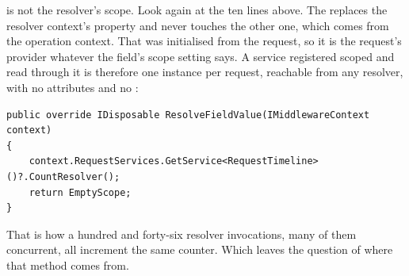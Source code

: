  is not the resolver's scope. Look again
at the ten lines above. The  replaces the resolver context's
 property and never touches the other one, which comes from the
operation context. That was initialised from the request, so it is the
request's provider whatever the field's scope setting says. A service
registered scoped and read through it is therefore one instance per request,
reachable from any resolver, with no attributes and no :

\begin{verbatim}
public override IDisposable ResolveFieldValue(IMiddlewareContext context)
{
    context.RequestServices.GetService<RequestTimeline>()?.CountResolver();
    return EmptyScope;
}
\end{verbatim}

That is how a hundred and forty-six resolver invocations, many of them
concurrent, all increment the same counter. Which leaves the question of where
that method comes from.
